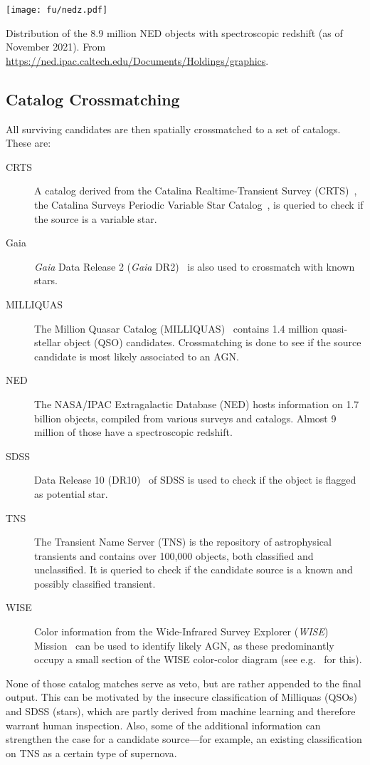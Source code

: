 \begin{marginfigure}
    \texttt{[image: fu/nedz.pdf]}
    \caption[NED spectroscopic redshift distribution]{Distribution of the 8.9 million NED objects with spectroscopic redshift (as of November 2021). From \url{https://ned.ipac.caltech.edu/Documents/Holdings/graphics}.}
\end{marginfigure}
\subsection{Catalog Crossmatching}\label{catmatch}
All surviving candidates are then spatially crossmatched to a set of catalogs. These are:
\begin{description}
    \item[CRTS] A catalog derived from the Catalina Realtime-Transient Survey (CRTS)~, the Catalina Surveys Periodic Variable Star Catalog~, is queried to check if the source is a variable star.
    \item[Gaia] \textit{Gaia} Data Release 2 (\textit{Gaia} DR2)~ is also used to crossmatch with known stars.
    \item[MILLIQUAS] The Million Quasar Catalog (MILLIQUAS)~ contains 1.4 million quasi-stellar object (QSO) candidates. Crossmatching is done to see if the source candidate is most likely associated to an AGN.
    \item[NED] The NASA/IPAC Extragalactic Database (NED) hosts information on 1.7 billion objects, compiled from various surveys and catalogs. Almost 9 million of those have a spectroscopic redshift.
    \item[SDSS] Data Release 10 (DR10)~ of SDSS is used to check if the object is flagged as potential star.
    \item[TNS] The Transient Name Server (TNS) is the repository of astrophysical transients and contains over 100,000 objects, both classified and unclassified. It is queried to check if the candidate source is a known and possibly classified transient.
    \item[WISE] Color information from the Wide-Infrared Survey Explorer (\textit{WISE}) Mission~ can be used to identify likely AGN, as these predominantly occupy a small section of the WISE color-color diagram (see e.g.~ for this).
\end{description}
None of those catalog matches serve as veto, but are rather appended to the final output. This can be motivated by the insecure classification of Milliquas (QSOs) and SDSS (stars), which are partly derived from machine learning and therefore warrant human inspection. Also, some of the additional information can strengthen the case for a candidate source---for example, an existing classification on TNS as a certain type of supernova.

